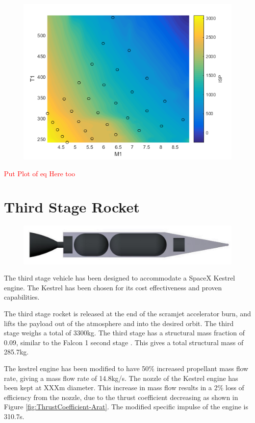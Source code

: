 	
	
	\begin{figure}
\centering
\includegraphics[width=0.7\linewidth]{figures/3_vehicle_design/ISPinterp}
\caption{}
\label{fig:ISPinterp}
\end{figure}

	
	\textcolor{red}{Put Plot of eq Here too}
	\section{Third Stage Rocket}
	
	\begin{figure}
\centering
\includegraphics[width=0.7\linewidth]{figures/3_vehicle_design/3rdStage}
\caption{}
\label{fig:3rdStage}
\end{figure}

	The third stage vehicle has been designed to accommodate a SpaceX Kestrel engine. The Kestrel has been chosen for its cost effectiveness and proven capabilities. 
	
	The third stage rocket is released at the end of the scramjet accelerator burn, and lifts the payload out of the atmosphere and into the desired orbit. The third stage weighs a total of 3300kg. The third stage has a structural mass fraction of 0.09, similar to the Falcon 1 second stage \cite{Vehicle2008}. This gives a total structural mass of 285.7kg. 
	
	

	
The kestrel engine has been modified to have 50\% increased propellant mass flow rate, giving a mass flow rate of 14.8kg/s. The nozzle of the Kestrel engine has been kept at XXXm diameter. This increase in mass flow results in a 2\% loss of efficiency from the nozzle\cite{RPE}, due to the thrust coefficient decreasing as shown in Figure \ref{fig:ThrustCoefficient-Arat}. The modified specific impulse of the engine is 310.7s.

